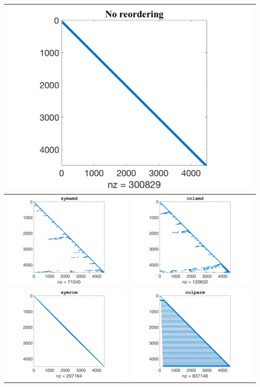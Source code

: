 \documentclass[11pt]{article}
\theoremstyle{definition}
\theoremstyle{remark}
\theoremstyle{plain}
\begin{document}
\begin{tabular}{|c|c|}
  \hline
  \multicolumn{2}{|c|}{\includegraphics[width=0.45\linewidth]{../Figures/default.png}}\\\hline
  \includegraphics[width=0.45\linewidth]{../Figures/symamd.png}&\includegraphics[width=0.45\linewidth]{../Figures/colamd.png}\\\hline
  \includegraphics[width=0.45\linewidth]{../Figures/symrcm.png}&\includegraphics[width=0.45\linewidth]{../Figures/colperm.png}\\\hline
\end{tabular}
\end{document}
